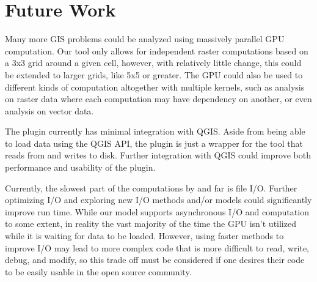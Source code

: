 \documentclass[journal]{IEEEtran}
\begin{document}
\section{Future Work}
Many more GIS problems could be analyzed using massively parallel GPU
computation.  Our tool only allows for independent raster computations based on
a 3x3 grid around a given cell, however, with relatively little change, this
could be extended to larger grids, like 5x5 or greater.  The GPU could also be
used to different kinds of computation altogether with multiple kernels, such
as analysis on raster data where each computation may have dependency on
another, or even analysis on vector data.

The plugin currently has minimal integration with QGIS. Aside from being able
to load data using the QGIS API, the plugin is just a wrapper for the tool
that reads from and writes to disk. Further integration with QGIS could improve
both performance and usability of the plugin.

Currently, the slowest part of the computations by and far is file I/O. Further
optimizing I/O and exploring new I/O methods and/or models could significantly
improve run time. While our model supports asynchronous I/O and computation to
some extent, in reality the vast majority of the time the GPU isn't utilized
while it is waiting for data to be loaded. However, using faster methods to
improve I/O may lead to more complex code that is more difficult to read,
write, debug, and modify, so this trade off must be considered if one desires
their code to be easily usable in the open source community.

\ifCLASSOPTIONcaptionsoff
  \newpage
\fi





\end{document}
